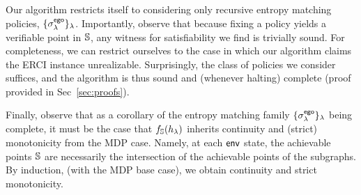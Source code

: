 
Our algorithm restricts itself to considering only recursive entropy
matching policies, $\{\sigma^{\mathsf{ego}}_\lambda\}_\lambda$.  Importantly,
observe that because fixing a policy yields a verifiable point in
$\mathbb{S}$, any witness for satisfiability we find is trivially sound. For completeness, we can restrict ourselves to the case in which our
algorithm claims the ERCI instance unrealizable. Surprisingly, the class of policies we consider suffices, and the algorithm 
is thus sound and (whenever halting) complete (proof provided in Sec~\ref{sec:proofs}).

Finally, observe that as a corollary of the entropy matching family
$\{\sigma^{\mathsf{ego}}_\lambda\}_\lambda$ being complete, it must be the case that
$f_\mathbb{S}(h_\lambda)$ inherits continuity and (strict) monotonicity
from the MDP case. Namely, at each $\mathsf{env}$ state, the achievable
points $\mathbb{S}$ are necessarily the intersection of the achievable
points of the subgraphs. By induction, (with the MDP base case), we
obtain continuity and strict monotonicity.


